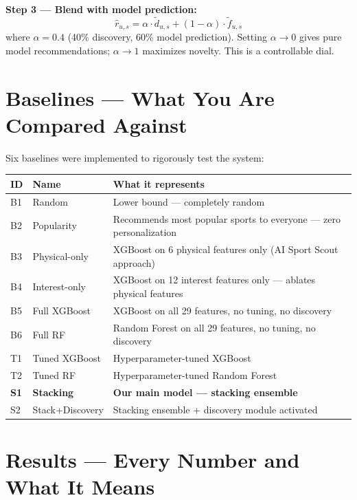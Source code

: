 \documentclass[12pt,a4paper]{article}
\begin{document}
\textbf{Step 3 --- Blend with model prediction:}
\[
\hat{r}_{u,s} = \alpha \cdot \tilde{d}_{u,s} + (1-\alpha) \cdot \tilde{f}_{u,s}
\]
where $\alpha = 0.4$ (40\% discovery, 60\% model prediction). Setting
$\alpha \to 0$ gives pure model recommendations; $\alpha \to 1$ maximizes
novelty. This is a controllable dial.

\section{Baselines --- What You Are Compared Against}

Six baselines were implemented to rigorously test the system:

\begin{center}
\begin{tabular}{llp{8.5cm}}
\toprule
\textbf{ID} & \textbf{Name} & \textbf{What it represents} \\
\midrule
B1 & Random & Lower bound --- completely random \\
B2 & Popularity & Recommends most popular sports to everyone --- zero personalization \\
B3 & Physical-only & XGBoost on 6 physical features only (AI Sport Scout approach) \\
B4 & Interest-only & XGBoost on 12 interest features only --- ablates physical features \\
B5 & Full XGBoost & XGBoost on all 29 features, no tuning, no discovery \\
B6 & Full RF & Random Forest on all 29 features, no tuning, no discovery \\
\midrule
T1 & Tuned XGBoost & Hyperparameter-tuned XGBoost \\
T2 & Tuned RF & Hyperparameter-tuned Random Forest \\
\textbf{S1} & \textbf{Stacking} & \textbf{Our main model --- stacking ensemble} \\
S2 & Stack+Discovery & Stacking ensemble + discovery module activated \\
\bottomrule
\end{tabular}
\end{center}

\section{Results --- Every Number and What It Means}
\end{document}
